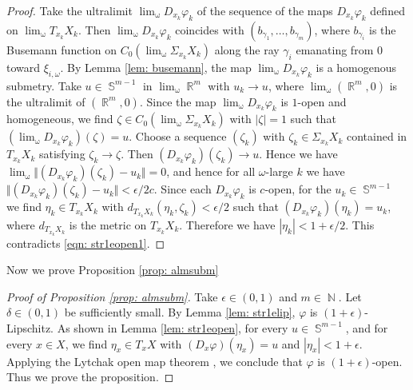 \documentclass[a4paper,12pt]{amsart}
\newcommand{\ulim}{\operatorname{\lim_{\omega}}}
\newcommand{\R}{\operatorname{\mathbb{R}}}
\newcommand{\N}{\operatorname{\mathbb{N}}}
\newcommand{\Sph}{\operatorname{\mathbb{S}}}
\numberwithin{equation}{section}
\theoremstyle{plain}
\theoremstyle{definition}
\theoremstyle{remark}
\begin{document}
\begin{proof}
Take the ultralimit $\ulim D_{x_k}\varphi_k$
of the sequence of the maps $D_{x_k}\varphi_k$
defined on $\ulim T_{x_k}X_k$.
Then $\ulim D_{x_k}\varphi_k$ coincides with 
$\left( b_{\gamma_1}, \dots, b_{\gamma_m} \right)$, 
where $b_{\gamma_i}$ is the Busemann function on 
$C_0 \left( \ulim \Sigma_{x_k}X_k \right)$ 
along the ray $\gamma_i$ emanating from $0$ toward $\xi_{i,\omega}$.
By Lemma \ref{lem: busemann},
the map $\ulim D_{x_k}\varphi_k$ is a homogenous submetry.
Take $u \in \Sph^{m-1}$ in 
$\ulim \R^m$ with $u_k \to u$,
where
$\ulim (\R^m,0)$ is the ultralimit of $(\R^m,0)$.
Since the map $\ulim D_{x_k}\varphi_k$ is $1$-open and homogeneous,
we find $\zeta \in C_0 \left( \ulim \Sigma_{x_k}X_k \right)$
with $\left\vert \zeta \right\vert = 1$
such that
$\left( \ulim D_{x_k}\varphi_k \right)(\zeta) = u$.
Choose a sequence $(\zeta_k)$ with $\zeta_k \in \Sigma_{x_k}X_k$ 
contained in $T_{x_k}X_k$
satisfying $\zeta_k \to \zeta$.
Then
$\left( D_{x_k}\varphi_k \right) \left( \zeta_k \right) \to u$.
Hence we have 
$\ulim \Vert \left( D_{x_k}\varphi_k \right) \left( \zeta_k \right) - u_k \Vert = 0$,
and hence for all $\omega$-large $k$
we have 
$\Vert \left( D_{x_k}\varphi_k \right)(\zeta_k) - u_k \Vert < \epsilon/2c$.
Since each $D_{x_k}\varphi_k$ is $c$-open,
for the $u_k \in \Sph^{m-1}$ we find $\eta_k \in T_{x_k}X_k$
with $d_{T_{x_k}X_k} \left( \eta_k, \zeta_k \right) < \epsilon/2$
such that
$\left( D_{x_k}\varphi_k \right) \left( \eta_k \right) = u_k$,
where $d_{T_{x_k}X_k}$ is the metric on $T_{x_k}X_k$.
Therefore we have
$\left\vert \eta_k \right\vert < 1 + \epsilon/2$.
This contradicts \eqref{eqn: str1eopen1}.
\end{proof}

Now we prove Proposition \ref{prop: almsubm}

\begin{proof}[Proof of Proposition \ref{prop: almsubm}]
Take $\epsilon \in (0,1)$ and $m \in \N$.
Let $\delta \in (0,1)$ be sufficiently small.
By Lemma \ref{lem: str1elip},
$\varphi$ is $(1+\epsilon)$-Lipschitz.
As shown in Lemma \ref{lem: str1eopen},
for every $u \in \Sph^{m-1}$,
and for every $x \in X$,
we find $\eta_x \in T_xX$ with 
$\left( D_x\varphi \right) \left( \eta_x \right) = u$
and $\left\vert \eta_x \right\vert < 1+\epsilon$.
Applying the Lytchak open map theorem 
\cite[Theorem 1.2]{lytchak2},
we conclude that $\varphi$ is $(1+\epsilon)$-open.
Thus we prove the proposition.
\end{proof}

\end{document}
